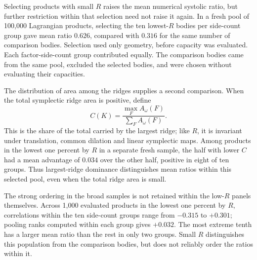 Selecting products with small $R$ raises the mean numerical systolic
ratio, but further restriction within that selection need not raise it
again. In a fresh pool of 100,000 Lagrangian products, selecting the ten
lowest-$R$ bodies per side-count group gave mean ratio $0.626$, compared
with $0.316$ for the same number of comparison bodies. Selection used only geometry, before capacity was evaluated.
Each factor-side-count group contributed equally. The comparison bodies
came from the same pool, excluded the selected bodies, and were chosen
without evaluating their capacities.

The distribution of area among the ridges supplies a second comparison.
When the total symplectic ridge area is positive, define
\[
 C(K)=\frac{\max_F A_\omega(F)}{\sum_F A_\omega(F)}.
\]
This is the share of the total carried by the largest ridge; like $R$,
it is invariant under translation, common dilation and linear symplectic
maps. Among products in the
lowest one percent by $R$ in a separate fresh sample, the half with lower
$C$ had a mean advantage of $0.034$ over the other half, positive in eight
of ten groups. Thus largest-ridge dominance distinguishes mean ratios within this
selected pool, even when the total ridge area is small.

The strong ordering in the broad samples is not retained within the
low-$R$ panels themselves. Across 1,000 evaluated products in the lowest
one percent by $R$, correlations within the ten side-count groups range
from $-0.315$ to $+0.301$; pooling ranks computed within each group gives
$+0.032$. The most extreme tenth has a larger mean ratio than the rest
in only two groups. Small $R$ distinguishes this population from the
comparison bodies, but does not reliably order the ratios within it.
